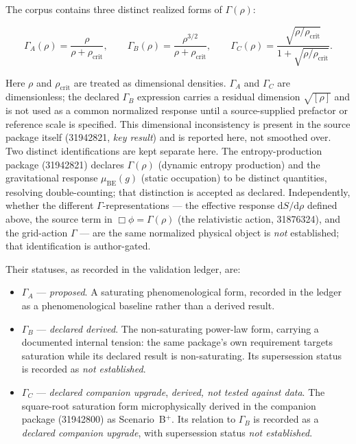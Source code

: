 \documentclass[11pt,a4paper]{article}
\begin{document}
The corpus contains three distinct realized forms of $\Gamma(\rho)$:

\begin{equation}
\Gamma_{A}(\rho) = \frac{\rho}{\rho + \rho_{\mathrm{crit}}},
\qquad
\Gamma_{B}(\rho) = \frac{\rho^{3/2}}{\rho + \rho_{\mathrm{crit}}},
\qquad
\Gamma_{C}(\rho) = \frac{\sqrt{\rho/\rho_{\mathrm{crit}}}}{1 + \sqrt{\rho/\rho_{\mathrm{crit}}}}.
\end{equation}

Here $\rho$ and $\rho_{\mathrm{crit}}$ are treated as dimensional densities. $\Gamma_{A}$ and $\Gamma_{C}$ are dimensionless; the declared $\Gamma_{B}$ expression carries a residual dimension $\sqrt{[\rho]}$ and is not used as a common normalized response until a source-supplied prefactor or reference scale is specified. This dimensional inconsistency is present in the source package itself (31942821, \emph{key result}) and is reported here, not smoothed over. Two distinct identifications are kept separate here. The entropy-production package (31942821) declares $\Gamma(\rho)$ (dynamic entropy production) and the gravitational response $\mu_{\mathrm{BE}}(g)$ (static occupation) to be distinct quantities, resolving double-counting; that distinction is accepted as declared. Independently, whether the different $\Gamma$-representations --- the effective response $\mathrm{d}S/\mathrm{d}\rho$ defined above, the source term in $\Box\phi = \Gamma(\rho)$ (the relativistic action, 31876324), and the grid-action $\Gamma$ --- are the same normalized physical object is \emph{not} established; that identification is author-gated.

Their statuses, as recorded in the validation ledger, are:

\begin{itemize}
\item $\Gamma_{A}$ --- \emph{proposed}. A saturating phenomenological form, recorded in the ledger as a phenomenological baseline rather than a derived result.
\item $\Gamma_{B}$ --- \emph{declared derived}. The non-saturating power-law form, carrying a documented internal tension: the same package's own requirement targets saturation while its declared result is non-saturating. Its supersession status is recorded as \emph{not established}.
\item $\Gamma_{C}$ --- \emph{declared companion upgrade}, \emph{derived, not tested against data}. The square-root saturation form microphysically derived in the companion package (31942800) as Scenario~B$^{+}$. Its relation to $\Gamma_{B}$ is recorded as a \emph{declared companion upgrade}, with supersession status \emph{not established}.
\end{itemize}
\end{document}

